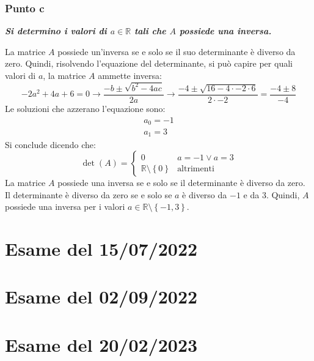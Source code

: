 \documentclass[a4paper]{article}
\begin{document}
	\subsubsection{Punto c}
	
	\textcolor{Green4}{\textbf{\emph{Si determino i valori di $a \in \mathbb{R}$ tali che $A$ possiede una inversa.}}}\newline
	
	\noindent
	La matrice $A$ possiede un'inversa se e solo se il suo determinante è diverso da zero. Quindi, risolvendo l'equazione del determinante, si può capire per quali valori di $a$, la matrice $A$ ammette inversa:
	\begin{equation*}
		-2a^{2} + 4a + 6 = 0\longrightarrow \dfrac{-b \pm \sqrt{b^{2} - 4ac}}{2a} \longrightarrow
		\dfrac{-4 \pm \sqrt{16 - 4 \cdot -2 \cdot 6}}{2 \cdot -2} = \dfrac{-4 \pm 8}{-4}
	\end{equation*}
	Le soluzioni che azzerano l'equazione sono:
	\begin{gather*}
		a_{0} = -1 \\
		a_{1} = 3
	\end{gather*}
	Si conclude dicendo che:
	\begin{equation*}
		\det\left(A\right) = \begin{cases}
			0										& a = -1 \lor a = 3 \\
			\mathbb{R} \setminus \left\{0\right\}	& \text{altrimenti}
		\end{cases}
	\end{equation*}
	La matrice $A$ possiede una inversa se e solo se il determinante è diverso da zero. Il determinante è diverso da zero se e solo se $a$ è diverso da $-1$ e da $3$. Quindi, $A$ possiede una inversa per i valori $a \in \mathbb{R} \setminus \left\{-1, 3\right\}$.
	
	\newpage
	\section{Esame del 15/07/2022}
	
	\newpage
	\section{Esame del 02/09/2022}
	
	\newpage
	\section{Esame del 20/02/2023}
\end{document}
